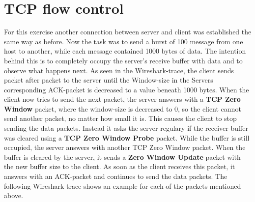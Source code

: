 \section{TCP flow control}
For this exercise another connection between server and client was established the same way as before. Now the task was to send a burst of 100 message from one host to another, while each message contained 1000 bytes of data. The intention behind this is to completely occupy the server's receive buffer with data and to observe what happens next. As seen in the Wireshark-trace, the client sends packet after packet to the server until the Window-size in the Servers corresponding ACK-packet is decreased to a value beneath 1000 bytes. When the client now tries to send the next packet, the server answers with a \textbf{TCP Zero Window} packet, where the window-size is decreased to 0, so the client cannot send another packet, no matter how small it is. This causes the client to stop sending the data packets. Instead it asks the server regulary if the receiver-buffer was cleared using a \textbf{TCP Zero Window Probe} packet. While the buffer is still occupied, the server answers with another TCP Zero Window packet. When the buffer is cleared by the server, it sends a \textbf{Zero Window Update} packet with the new buffer size to the client. As soon as the client receives this packet, it answers with an ACK-packet and continues to send the data packets. The following Wireshark trace shows an example for each of the packets mentioned above.
\\
